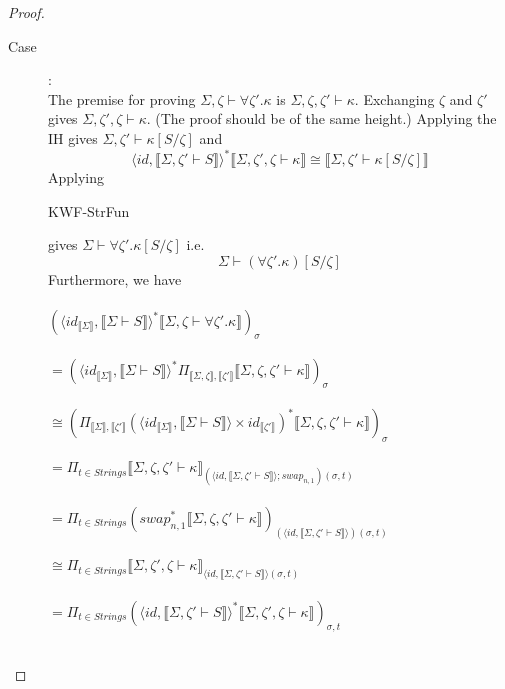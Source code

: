 \documentclass{article}
\newcommand{\sem}[1]{\llbracket #1 \rrbracket}
\begin{document}
\begin{proof}
\begin{description}
\item[Case ]:~\\
The premise for proving $\Sigma,\zeta \vdash \forall \zeta'.\kappa$ is $\Sigma,\zeta,\zeta' \vdash \kappa$. Exchanging $\zeta$ and $\zeta'$ gives $\Sigma,\zeta',\zeta \vdash \kappa$. (The proof should be of the same height.) Applying the IH gives $\Sigma,\zeta' \vdash \kappa[S/\zeta]$ and $$\langle \mathit{id}, \sem{\Sigma,\zeta' \vdash S} \rangle^* \sem{\Sigma,\zeta',\zeta \vdash \kappa} \cong \sem{\Sigma,\zeta' \vdash \kappa[S/\zeta]}$$ Applying \begin{sc}KWF-StrFun\end{sc} gives $\Sigma \vdash \forall \zeta'. \kappa[S/\zeta]$ i.e.
$$\Sigma \vdash (\forall \zeta'. \kappa)[S/\zeta]$$
Furthermore, we have\\~\\
$(\langle \mathit{id}_{\sem{\Sigma}}, \sem{\Sigma \vdash S} \rangle^* \sem{\Sigma,\zeta \vdash \forall \zeta'. \kappa})_\sigma$\\~\\
$= (\langle \mathit{id}_{\sem{\Sigma}}, \sem{\Sigma \vdash S} \rangle^* \Pi_{\sem{\Sigma,\zeta},\sem{\zeta'}} \sem{\Sigma,\zeta,\zeta' \vdash \kappa})_\sigma$\\~\\
$\cong (\Pi_{\sem{\Sigma},\sem{\zeta'}} (\langle \mathit{id}_{\sem{\Sigma}}, \sem{\Sigma \vdash S} \rangle \times \mathit{id}_{\sem{\zeta'}})^* \sem{\Sigma, \zeta, \zeta' \vdash \kappa})_\sigma$\\~\\
$= \Pi_{t \in \mathit{Strings}} \sem{\Sigma,\zeta,\zeta' \vdash \kappa}_{(\langle \mathit{id}, \sem{\Sigma,\zeta' \vdash S} \rangle; \mathit{swap}_{n,1})(\sigma, t)}$\\~\\ 
$= \Pi_{t \in \mathit{Strings}} (\mathit{swap}_{n,1}^* \sem{\Sigma,\zeta,\zeta' \vdash \kappa})_{(\langle \mathit{id}, \sem{\Sigma,\zeta' \vdash S} \rangle)(\sigma, t)}$\\~\\
$\cong \Pi_{t \in \mathit{Strings}} \sem{\Sigma,\zeta',\zeta \vdash \kappa}_{\langle \mathit{id}, \sem{\Sigma,\zeta' \vdash S} \rangle(\sigma, t)}$\\~\\
$= \Pi_{t \in \mathit{Strings}} (\langle \mathit{id}, \sem{\Sigma,\zeta' \vdash S} \rangle^* \sem{\Sigma,\zeta',\zeta \vdash \kappa})_{\sigma,t}$\\~\\

\end{description}
\end{proof}
\end{document}
